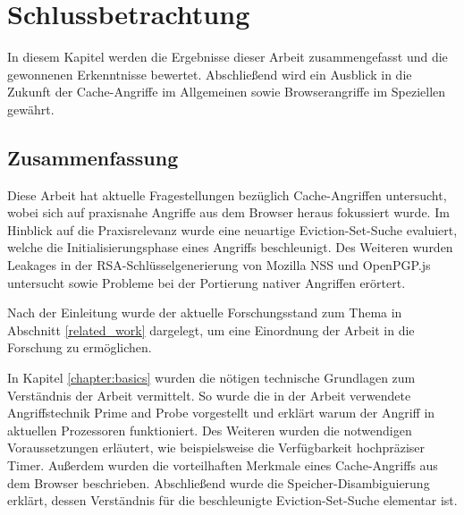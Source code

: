 \chapter{Schlussbetrachtung}
\label{chapter:conclusions}

In diesem Kapitel werden die Ergebnisse dieser Arbeit zusammengefasst und die gewonnenen Erkenntnisse bewertet.
Abschließend wird ein Ausblick in die Zukunft der Cache-Angriffe im Allgemeinen sowie Browserangriffe im Speziellen gewährt.

\section{Zusammenfassung}
Diese Arbeit hat aktuelle Fragestellungen bezüglich Cache-Angriffen untersucht, wobei sich auf praxisnahe Angriffe aus dem Browser heraus fokussiert wurde.
Im Hinblick auf die Praxisrelevanz wurde eine neuartige Eviction-Set-Suche evaluiert, welche die Initialisierungsphase eines Angriffs beschleunigt.
Des Weiteren wurden Leakages in der RSA-Schlüsselgenerierung von Mozilla NSS und OpenPGP.js untersucht sowie Probleme bei der Portierung nativer Angriffen erörtert.

\par \medskip                         

Nach der Einleitung wurde der aktuelle Forschungsstand zum Thema in Abschnitt \ref{related_work} dargelegt, um eine Einordnung der Arbeit in die Forschung zu ermöglichen.

\par \medskip                     

In Kapitel \ref{chapter:basics} wurden die nötigen technische Grundlagen zum Verständnis der Arbeit vermittelt.
So wurde die in der Arbeit verwendete Angriffstechnik Prime and Probe vorgestellt und erklärt warum der Angriff in aktuellen Prozessoren funktioniert.
Des Weiteren wurden die notwendigen Voraussetzungen erläutert, wie beispielsweise die Verfügbarkeit hochpräziser Timer.
Außerdem wurden die vorteilhaften Merkmale eines Cache-Angriffs aus dem Browser beschrieben.
Abschließend wurde die Speicher-Disambiguierung erklärt, dessen Verständnis für die beschleunigte Eviction-Set-Suche elementar ist.

\par \medskip                     

